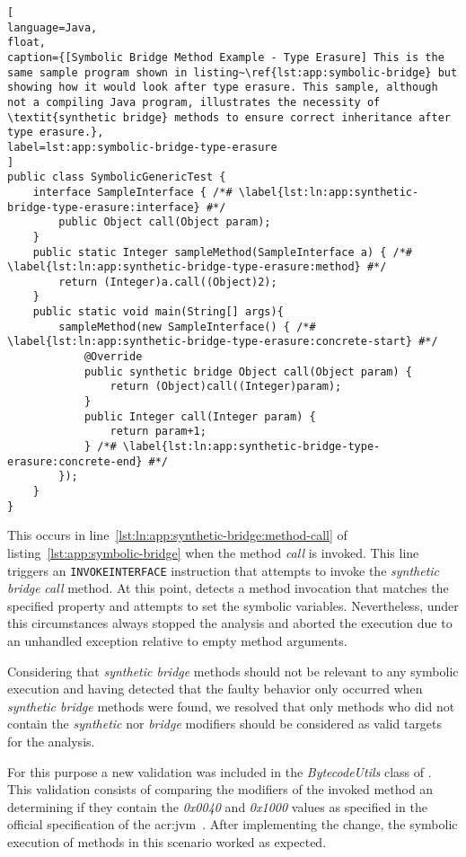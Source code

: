 \begin{lstlisting}[
language=Java,
float,
caption={[Symbolic Bridge Method Example - Type Erasure] This is the same sample program shown in listing~\ref{lst:app:symbolic-bridge} but showing how it would look after type erasure. This sample, although not a compiling Java program, illustrates the necessity of \textit{synthetic bridge} methods to ensure correct inheritance after type erasure.},
label=lst:app:symbolic-bridge-type-erasure
]
public class SymbolicGenericTest {
	interface SampleInterface { /*# \label{lst:ln:app:synthetic-bridge-type-erasure:interface} #*/
		public Object call(Object param); 
	}
	public static Integer sampleMethod(SampleInterface a) { /*# \label{lst:ln:app:synthetic-bridge-type-erasure:method} #*/
		return (Integer)a.call((Object)2);
	}
	public static void main(String[] args){
		sampleMethod(new SampleInterface() { /*# \label{lst:ln:app:synthetic-bridge-type-erasure:concrete-start} #*/
			@Override
			public synthetic bridge Object call(Object param) {
				return (Object)call((Integer)param);
			}
			public Integer call(Integer param) {				
				return param+1;
			} /*# \label{lst:ln:app:synthetic-bridge-type-erasure:concrete-end} #*/
		});
	}
}
\end{lstlisting}

This occurs in line~\ref{lst:ln:app:synthetic-bridge:method-call} of listing~\ref{lst:app:symbolic-bridge} when the method \textit{call} is invoked. This line triggers an \texttt{INVOKEINTERFACE} instruction that attempts to invoke the \textit{synthetic bridge} \textit{call} method. At this point, \spf{} detects a method invocation that matches the specified property and attempts to set the symbolic variables. Nevertheless, under this circumstances \spf{} always stopped the analysis and aborted the execution due to an unhandled exception relative to empty method arguments.

Considering that \textit{synthetic bridge} methods should not be relevant to any symbolic execution and having detected that the faulty behavior only occurred when \textit{synthetic bridge} methods were found, we resolved that only methods who did not contain the \textit{synthetic} nor \textit{bridge} modifiers should be considered as valid targets for the analysis.

For this purpose a new validation was included in the \textit{BytecodeUtils} class of \spf{}. This validation consists of comparing the modifiers of the invoked method an determining if they contain the \textit{0x0040} and \textit{0x1000} values as specified in the official specification of the \acrshort{acr:jvm}~\cite{Lindholm2014}. After implementing the change, the symbolic execution of methods in this scenario worked as expected. 

